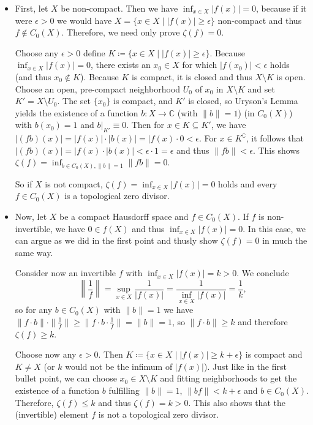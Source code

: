 \documentclass[a4paper]{article}
\begin{document}
\begin{itemize}
    \item First, let $X$ be non-compact.
    Then we have $\inf_{x \in X} |f(x)| = 0$, because if it were $\epsilon > 0$ we would have $X = \{ x \in X \mid |f(x)| \geq \epsilon \}$ non-compact and thus $f \notin C_0(X)$.
    Therefore, we need only prove $\zeta(f) = 0$.

    Choose any $\epsilon > 0$ define $K \coloneq \{ x \in X \mid |f(x)| \geq \epsilon \}$.
    Because $\inf_{x \in X} |f(x)| = 0$, there exists an $x_0 \in X$ for which $|f(x_0)| < \epsilon$ holds (and thus $x_0 \notin K$).
    Because $K$ is compact, it is closed and thus $X \setminus K$ is open.
    Choose an open, pre-compact neighborhood $U_0$ of $x_0$ in $X \setminus K$ and set $K' = X \setminus U_0$.
    The set $\{x_0\}$ is compact, and $K'$ is closed, so Uryson's Lemma yields the existence of a function $b: X \to \mathds{C}$ (with $\|b\| = 1$) (in $C_0(X)$) with $b(x_0) = 1$ and $b|_{K'} \equiv 0$.
    Then for $x \in K \subseteq K'$, we have $|(fb)(x)| = |f(x)| \cdot |b(x)| = |f(x) \cdot 0 < \epsilon$.
    For $x \in K^\complement$, it follows that $|(fb)(x)| = |f(x) \cdot |b(x)| < \epsilon \cdot 1 = \epsilon$ and thus $\|f b \| < \epsilon$. 
    This shows $\zeta(f) = \inf_{b \in C_0(X), \|b\| = 1} \| f b \| = 0$.

    So if $X$ is not compact, $\zeta(f) = \inf_{x \in X} |f(x)| = 0$ holds and every $f \in C_0(X)$ is a topological zero divisor.
    \item Now, let $X$ be a compact Hausdorff space and $f \in C_0(X)$.
    If $f$ is non-invertible, we have $0 \in f(X)$ and thus $\inf_{x \in X} |f(x)| = 0$. 
    In this case, we can argue as we did in the first point and thusly show $\zeta(f) = 0$ in much the same way.

    Consider now an invertible $f$ with $\inf_{x \in X} |f(x)| = k > 0$.
    We conclude 
    \begin{equation*}
        \left\| \frac{1}{f} \right\| = \sup_{x \in X} \frac{1}{|f(x)|} = \frac{1}{\inf_{x \in X} |f(x)|} = \frac{1}{k}\text{,}
    \end{equation*}
    so for any $b \in C_0(X)$ with $\|b\| = 1$ we have $\|f \cdot b\| \cdot \| \frac{1}{f}\| \geq \|f \cdot b \cdot \frac{1}{f} \| = \|b\| = 1$, so $\|f \cdot b \| \geq k$ and therefore $\zeta(f) \geq k$.

    Choose now any $\epsilon > 0$.
    Then $K \coloneq \{ x \in X \mid |f(x)| \geq k + \epsilon \}$ is compact and $K \neq X$ (or $k$ would not be the infimum of $|f(x)|$).
    Just like in the first bullet point, we can choose $x_0 \in X \setminus K$ and fitting neighborhoods to get the existence of a function $b$ fulfilling $\|b\| = 1$, $\|b f \| < k + \epsilon$ and $b \in C_0(X)$.
    Therefore, $\zeta(f) \leq k$ and thus $\zeta(f) = k > 0$.
    This also shows that the (invertible) element $f$ is not a topological zero divisor.
\end{itemize}
\end{document}
